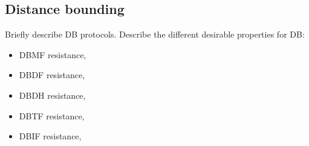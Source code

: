 \subsection{Distance bounding}

Briefly describe \ac{DB} protocols.
Describe the different desirable properties for \ac{DB}:
\begin{itemize}
  \item \ac{DBMF} resistance,
  \item \ac{DBDF} resistance,
  \item \ac{DBDH} resistance,
  \item \ac{DBTF} resistance,
  \item \ac{DBIF} resistance,
\end{itemize}


